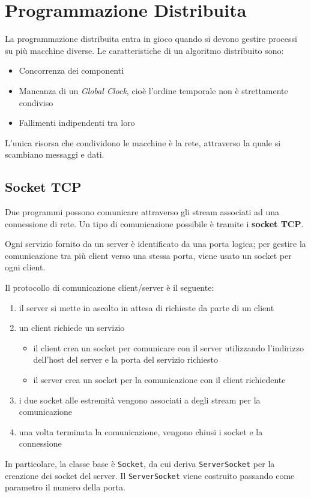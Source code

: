 \chapter{Programmazione Distribuita}
La programmazione distribuita entra in gioco quando si devono gestire processi su più macchine diverse. Le caratteristiche di un algoritmo distribuito sono:
\begin{itemize}
\item Concorrenza dei componenti
\item Mancanza di un \textit{Global Clock}, cioè l'ordine temporale non è strettamente condiviso
\item Fallimenti indipendenti tra loro
\end{itemize}
L'unica risorsa che condividono le macchine è la rete, attraverso la quale si scambiano messaggi e dati. 

\section{Socket TCP}
Due programmi possono comunicare attraverso gli stream associati ad una connessione di rete. Un tipo di comunicazione possibile è tramite i \textbf{socket TCP}. 

Ogni servizio fornito da un server è identificato da una porta logica; per gestire la comunicazione tra più client verso una stessa porta, viene usato un socket per ogni client. 

Il protocollo di comunicazione client/server è il seguente:
\begin{enumerate}
\item il server si mette in ascolto in attesa di richieste da parte di un client
\item un client richiede un servizio
\begin{itemize}
\item il client crea un socket per comunicare con il server utilizzando l'indirizzo dell'host del server e la porta del servizio richiesto
\item il server crea un socket per la comunicazione con il client richiedente
\end{itemize}
\item i due socket alle estremità vengono associati a degli stream per la comunicazione
\item una volta terminata la comunicazione, vengono chiusi i socket e la connessione 
\end{enumerate}
In particolare, la classe base è \texttt{Socket}, da cui deriva \texttt{ServerSocket} per la creazione dei socket del server. Il \texttt{ServerSocket} viene costruito passando come parametro il numero della porta.

